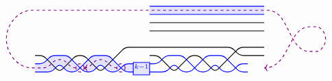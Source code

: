 \begin{figure}[ht]
\[\begin{tikzcd}[row sep=2pc]
\begin{tikzpicture}[baseline=-.5ex, scale=0.6]
\begin{scope}
\draw[thick, rounded corners] (-7, -1) -- ++(0.5, 0) -- ++(1, -1) -- ++(1, 1) -- ++(0.5, 0) -- ++(1, -1) -- ++(1.5, 1.5) -- ++(1, 0) -- ++(0.5, 0);
\draw[thick, blue, rounded corners] (-7, -1.5) -- ++(0.5, 0) -- ++(0.5, 0.5) -- ++(1, 0) -- ++(1, -1) -- ++(0.5, 0) -- ++(0.5, 0.5) -- ++(0.5, -0.5) -- ++(0.5, 0) -- ++(0.5, 0.5) -- ++(0.5, 0);
\draw[thick, blue, rounded corners] (-7, -2) -- ++(0.5, 0) -- ++(0.5, 0) -- ++(0.5, 0.5) -- ++(0.5, -0.5) -- ++(0.5, 0) -- ++(1, 1) -- ++(1, 0) -- ++(1, -1) -- ++(0.5, 0);
\draw[thick, blue, fill=blue!10] (-1, -2.175) rectangle ++(1, 0.75) node[pos=.5] {$\scriptstyle k-1$};
\fill[blue, opacity=0.1] (-7, -2) [rounded corners]-- ++(0.5, 0) -- ++(0.5, 0) -- ++(0.5, 0.5) -- ++(0.5, -0.5) -- ++(0.5, 0) [sharp corners]-- ++(0.25, 0.25) 
[rounded corners]-- ++(-0.75, 0.75) -- ++(-1, 0) -- ++(-0.5, -0.5) -- ++(-0.5, 0);
\fill[blue, opacity=0.1] (-4.25, -1.75) [rounded corners]-- ++(0.75, 0.75) -- ++(1, 0) [sharp corners]-- ++(0.75, -0.75)
[rounded corners]-- ++(-0.25, -0.25) -- ++(-0.5, 0) -- ++(-0.5, 0.5) -- ++(-0.5, -0.5) -- ++(-0.5, 0) -- ++(-0.25, 0.25);
\fill[blue, opacity=0.1] (-1, -1.5) -- ++(-0.5, 0) -- ++(-0.25, -0.25) -- ++(0.25, -0.25) -- ++(0.5, 0);
%
\draw[thick, violet, dashed] 
(-4.25, -1.75) circle (0.25)
(-1.75, -1.75) circle (0.25)
;
\draw[thick, violet, dashed, ->, rounded corners]
(-2, -1.75) -- ++(-0.25, 0) -- ++(-0.5, 0.5) -- ++(-0.5, 0) -- ++(-0.5, -0.5) -- ++(-0.25, 0);
\draw[thick, violet, dashed, ->, rounded corners]
(-4.5, -1.75) -- ++(-0.25, 0) -- ++(-0.5, 0.5) -- ++(-0.5, 0) -- ++(-0.5, -0.5) -- ++(-0.75, 0) arc (-90:-270:1.75) -- ++(14, 0) to[out=0, in=180] ++(3, -2.5) arc (-90:90:0.75) to[out=180, in=0] ++(-3, -2.5);
%
\end{scope}
\begin{scope}[xshift=7cm]
\draw[thick] (-7, 0.5) -- ++(7,0) (-7, 1) -- ++(7,0);
\draw[thick, blue] (-7, 1.5) -- ++(7,0) (-7, 2) -- ++(7,0);
\fill[blue, opacity=0.1] (-7, 1.5) -- ++(7,0) -- ++(0, 0.5) -- ++(-7, 0);
%
\draw[thick, rounded corners] (-7, -0.5) -- ++(0.5, 0) -- ++(4.5, 0) -- ++(0.5, -0.5) -- ++(1,0) -- ++(0.5, 0);
\draw[thick, rounded corners] (-7, -1) -- ++(0.5, 0) -- ++(1, -1) -- ++(1, 1) -- ++(0.5, 0) -- ++(1, -1) -- ++(1.5, 1.5) -- ++(1, 0) -- ++(0.5, 0);
\draw[thick, blue, rounded corners] (-7, -1.5) -- ++(0.5, 0) -- ++(0.5, 0.5) -- ++(1, 0) -- ++(1, -1) -- ++(0.5, 0) -- ++(0.5, 0.5) -- ++(0.5, -0.5) -- ++(0.5, 0) -- ++(0.5, 0.5) -- ++(0.5, 0);
\draw[thick, blue, rounded corners] (-7, -2) -- ++(0.5, 0) -- ++(0.5, 0) -- ++(0.5, 0.5) -- ++(0.5, -0.5) -- ++(0.5, 0) -- ++(1, 1) -- ++(1, 0) -- ++(1, -1) -- ++(0.5, 0);

\end{scope}
\end{tikzpicture}
\end{tikzcd}\]
\end{figure}
